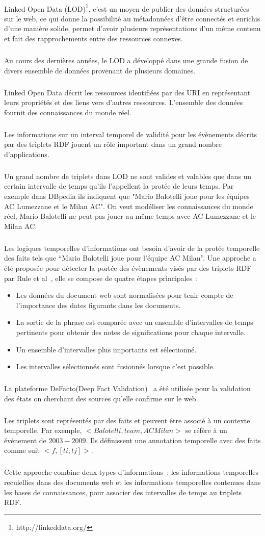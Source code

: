 \paragraph{}
Linked Open Data (LOD)\footnote{http://linkeddata.org/}, c'est un moyen de publier des données structurées sur le web, ce qui donne la possibilité au métadonnées d'être connectés et enrichis d'une manière solide, permet d'avoir plusieurs représentations d'un même contenu et fait des rapprochements entre des ressources connexes. 
\subparagraph{}
Au cours des dernières années, le LOD a développé dans une grande fusion de divers ensemble de données provenant de plusieurs domaines.
\subparagraph{}
Linked Open Data décrit les ressources identifiées par des URI en représentant leurs propriétés et des liens vers d’autres ressources.
L'ensemble des données fournit des connaissances du monde réel.
\subparagraph{}
Les informations sur un interval temporel de validité pour les évènements décrits par des triplets RDF jouent un rôle important dans un grand nombre d'applications.
\subparagraph{}
Un grand nombre de triplets dans LOD ne sont valides et valables que dans un certain intervalle de temps qu'ils l'appellent la protée de leurs temps.
Par exemple dans DBpedia ils indiquent que "Mario Balotelli joue pour les équipes AC Lumezzane et le Milan AC". On veut modéliser les connaissances du monde réel, Mario Balotelli ne peut pas jouer au même temps avec AC Lumezzane et le Milan AC.
\subparagraph{}
Les logiques temporelles d'informations ont besoin d'avoir de la protée temporelle des faits tels que “Mario Balotelli joue pour l'équipe AC Milan”.
Une approche a été proposée pour détecter la portée des évènements visés par des triplets RDF par Rule et al~\cite{rula2013}, elle se compose de quatre étapes principales~:
\begin{itemize}
\item Les données du document web sont normalisées pour tenir compte de l’importance des dates figurants dans les documents.
\item La sortie de la phrase est comparée avec un ensemble d’intervalles de temps pertinents pour obtenir des notes de significations pour chaque intervalle.
\item Un ensemble d’intervalles plus importants est sélectionné.
\item Les intervalles sélectionnés sont fusionnés lorsque c’est possible.
\end{itemize}
\subparagraph{}
La plateforme DeFacto(Deep Fact Validation)~\cite{lehmann2012} a été utilisée pour la validation des états on cherchant des sources qu'elle confirme sur le web.
\subparagraph{}
Les triplets sont représentés par des faits et peuvent être associé à un contexte temporelle.
Par exemple, $<Balotelli, team, AC Milan>$ se réfère à un événement de $2003-2009$. 
Ils définissent une annotation temporelle avec des faits comme suit $<f, [ti,tj]>$.
\subparagraph{}
Cette approche combine deux types d'informations~: les informations temporelles recuiellies dans des documents web et les informations temporelles contenues dans les bases de connaissances, pour associer des intervalles de temps au triplets RDF.

